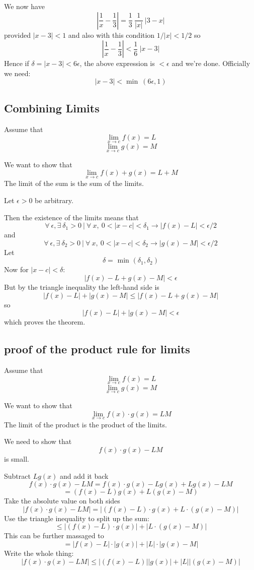 \documentclass[11pt, oneside]{article}
\begin{document}
We now have
\[ | \frac{1}{x} - \frac{1}{3} | = \frac{1}{3} \ \frac{1}{|x|} \ |3 - x|   \]
provided $|x - 3| < 1$ and also with this condition $1/|x| < 1/2$ so
\[  | \frac{1}{x} - \frac{1}{3} | < \frac{1}{6} \ |x - 3| \]
Hence if $\delta = |x - 3| < 6 \epsilon$, the above expression is $< \epsilon$ and we're done.  Officially we need:
\[ |x - 3| < \min \ (6 \epsilon, 1) \]

\subsection*{Combining Limits}

Assume that
\[ \lim_{x \rightarrow c} f(x) = L \]
\[ \lim_{x \rightarrow c} g(x) = M \]

We want to show that
\[ \lim_{x \rightarrow c} f(x) + g(x) = L + M \]
The limit of the sum is the sum of the limits.

Let $\epsilon > 0$ be arbitrary.

Then the existence of the limits means that
\[ \forall \ \epsilon, \exists \ \delta_1 > 0 \ | \ \forall \ x, \ 0 < | x - c| < \delta_1 \rightarrow | f(x) - L | < \epsilon/2 \]
and
\[ \forall \ \epsilon, \exists \ \delta_2 > 0 \ | \ \forall \ x, \ 0 < | x - c| < \delta_2 \rightarrow | g(x) - M | < \epsilon/2 \]
Let
\[ \delta = \text{ min } (\delta_1, \delta_2) \]
Now for $|x - c| < \delta$:
\[ | f(x) - L + g(x) - M| < \epsilon \]
But by the triangle inequality the left-hand side is 
\[ | f(x) - L| + |g(x) - M|  \le | f(x) - L + g(x) - M|  \]
so
\[   | f(x) - L| + |g(x) - M| < \epsilon \]
which proves the theorem.

\subsection*{proof of the product rule for limits}
Assume that
\[ \lim_{x \rightarrow c} f(x) = L \]
\[ \lim_{x \rightarrow c} g(x) = M \]

We want to show that
\[ \lim_{x \rightarrow c} f(x) \cdot g(x) = LM \]
The limit of the product is the product of the limits.

We need to show that
\[ f(x) \cdot g(x) - LM \]
is small.  

Subtract $L g(x)$ and add it back
\[ f(x) \cdot g(x) - LM = f(x) \cdot g(x) - L g(x) + L g(x) - LM \]
\[ = (f(x) - L) g(x) + L (g(x) - M ) \]
Take the absolute value on both sides
\[  |f(x) \cdot g(x) - LM| = |(f(x) - L) \cdot g(x) + L \cdot (g(x) - M )| \]
Use the triangle inequality to split up the sum:
\[ \le |(f(x) - L) \cdot g(x)| + |L \cdot (g(x) - M )| \]
This can be further massaged to 
\[  =| f(x) - L | \cdot |g(x)| + |L| \cdot |g(x) - M | \]
Write the whole thing:
\[ |f(x) \cdot g(x) - LM| \le |(f(x) - L) | | g(x) | + | L | | (g(x) - M )| \]
\end{document}
